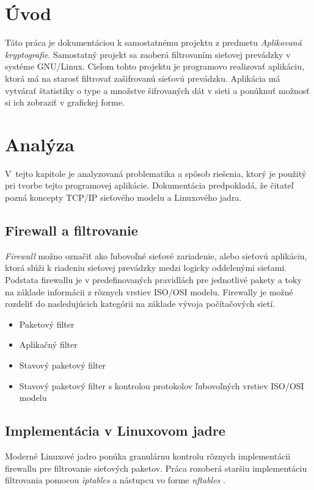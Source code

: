 
\chapter{Úvod}
Táto práca je dokumentáciou k samostatnému projektu z predmetu \emph{Aplikovaná kryptografie}. Samostatný projekt sa zaoberá filtrovaním sieťovej prevádzky v systéme GNU/Linux. Cieľom tohto projektu je programovo realizovať aplikáciu, ktorá má na starosť filtrovať zašifrovanú sieťovú prevádzku. Aplikácia má vytvárať štatistiky o type a množstve šifrovaných dát v sieti a ponúknuť možnosť si ich zobraziť v grafickej forme. 

\chapter{Analýza}
V~tejto kapitole je analyzovaná problematika a spôsob riešenia, ktorý je použitý pri tvorbe tejto programovej aplikácie. Dokumentácia predpokladá, že čitateľ pozná koncepty TCP/IP sieťového modelu a Linuxového jadra.

\section{Firewall a filtrovanie}
\emph{Firewall} možno označiť ako ľubovoľné sieťové zariadenie, alebo sieťovú aplikáciu, ktorá slúži k riadeniu sieťovej prevádzky medzi logicky oddelenými sieťami. Podstata firewallu je v predefinovaných pravidlách pre jednotlivé pakety a toky na základe informácii z rôznych vrstiev ISO/OSI modelu. Firewally je možné rozdeliť do nasledujúcich kategórii na základe vývoja počítačových sietí. 

\begin{itemize}
	\itemsep0em 
	\item Paketový filter
	\item Aplikačný filter
	\item Stavový paketový filter
	\item Stavový paketový filter s kontrolou protokolov ľubovoľných vrstiev ISO/OSI modelu
\end{itemize}

\cite{Oppliger1997}

\section{Implementácia v Linuxovom jadre}
Moderné Linuxové jadro ponúka granulárnu kontrolu rôznych implementácii firewallu pre filtrovanie sieťových paketov. Práca rozoberá staršiu implementáciu filtrovania pomocou \emph{iptables} a nástupcu vo forme \emph{nftables} \cite{manpages}.

